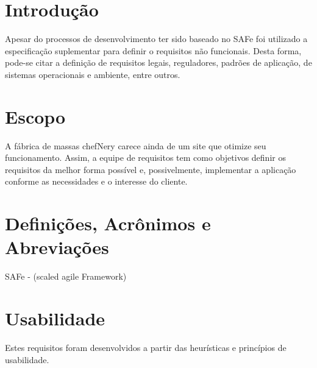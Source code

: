 \begin{apendicesenv}
{\large {\section { Introdução \\ } } }

Apesar do processos de desenvolvimento ter sido baseado no SAFe foi utilizado a especificação suplementar para definir o requisitos não funcionais. Desta forma, pode-se citar a definição de requisitos legais, reguladores, padrões de aplicação, de sistemas operacionais e ambiente, entre outros.

{\large {\section { Escopo \\ } } }

A fábrica de massas chefNery carece ainda de um site que otimize seu funcionamento. Assim, a equipe de requisitos tem como objetivos definir os requisitos da melhor forma possível e, possivelmente, implementar a aplicação conforme as necessidades e o interesse do cliente.

{\large {\section { Definições, Acrônimos e Abreviações \\ } } }

SAFe - (scaled agile Framework)

{\large {\section { Usabilidade \\ } } }

Estes requisitos foram desenvolvidos a partir das heurísticas e princípios de usabilidade.



\end{apendicesenv}
